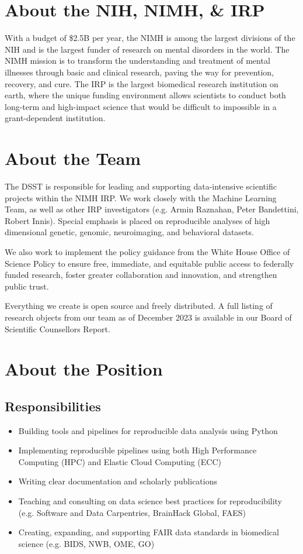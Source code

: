 \documentclass[10pt,letterpaper]{article}
\begin{document}
\begin{multicols}{2}
\section*{About the NIH, NIMH, \& IRP}
With a budget of \$2.5B per year, the NIMH is among the largest divisions of the NIH and is the largest funder of research on mental disorders in the world. The NIMH mission is to transform the understanding and treatment of mental illnesses through basic and clinical research, paving the way for prevention, recovery, and cure. The IRP is the largest biomedical research institution on earth, where the unique funding environment allows scientists to conduct both long-term and high-impact science that would be difficult to impossible in a grant-dependent institution.

\section*{About the Team}
The DSST is responsible for leading and supporting data-intensive scientific projects within the NIMH IRP. We work closely with the Machine Learning Team, as well as other IRP investigators (e.g. Armin Raznahan, Peter Bandettini, Robert Innis). Special emphasis is placed on reproducible analyses of high dimensional genetic, genomic, neuroimaging, and behavioral datasets.

We also work to implement the policy guidance from the White House Office of Science Policy to ensure free, immediate, and equitable public access to federally funded research, foster greater collaboration and innovation, and strengthen public trust.

Everything we create is open source and freely distributed. A full listing of research objects from our team as of December 2023 is available in our Board of Scientific Counsellors Report.

\section*{About the Position}
\subsection*{Responsibilities}
\begin{itemize}[leftmargin=*, noitemsep, topsep=0pt]
    \item Building tools and pipelines for reproducible data analysis using Python
    \item Implementing reproducible pipelines using both High Performance Computing (HPC) and Elastic Cloud Computing (ECC)
    \item Writing clear documentation and scholarly publications
    \item Teaching and consulting on data science best practices for reproducibility (e.g. Software and Data Carpentries, BrainHack Global, FAES)
    \item Creating, expanding, and supporting FAIR data standards in biomedical science (e.g. BIDS, NWB, OME, GO)
\end{itemize}


\end{multicols}
\end{document}
